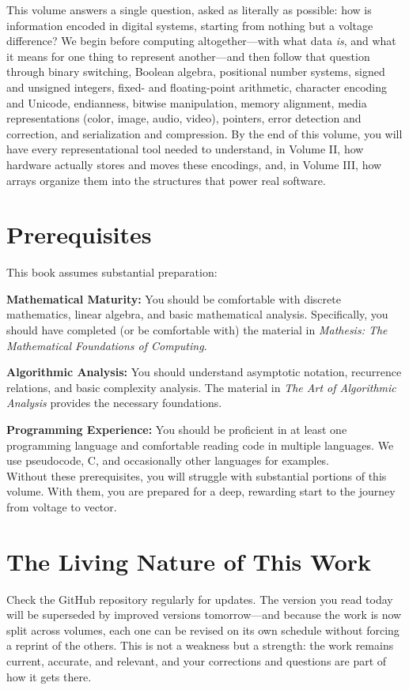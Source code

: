 This volume answers a single question, asked as literally as possible: how is information encoded in digital systems, starting from nothing but a voltage difference? We begin before computing altogether---with what data \emph{is}, and what it means for one thing to represent another---and then follow that question through binary switching, Boolean algebra, positional number systems, signed and unsigned integers, fixed- and floating-point arithmetic, character encoding and Unicode, endianness, bitwise manipulation, memory alignment, media representations (color, image, audio, video), pointers, error detection and correction, and serialization and compression. By the end of this volume, you will have every representational tool needed to understand, in Volume II, how hardware actually stores and moves these encodings, and, in Volume III, how arrays organize them into the structures that power real software.

\section*{Prerequisites}

This book assumes substantial preparation:

\textbf{Mathematical Maturity:} You should be comfortable with discrete mathematics, linear algebra, and basic mathematical analysis. Specifically, you should have completed (or be comfortable with) the material in \textit{Mathesis: The Mathematical Foundations of Computing}.

\textbf{Algorithmic Analysis:} You should understand asymptotic notation, recurrence relations, and basic complexity analysis. The material in \textit{The Art of Algorithmic Analysis} provides the necessary foundations.

\textbf{Programming Experience:} You should be proficient in at least one programming language and comfortable reading code in multiple languages. We use pseudocode, C, and occasionally other languages for examples.\\
Without these prerequisites, you will struggle with substantial portions of this volume. With them, you are prepared for a deep, rewarding start to the journey from voltage to vector.

\section*{The Living Nature of This Work}

Check the GitHub repository regularly for updates. The version you read today will be superseded by improved versions tomorrow---and because the work is now split across volumes, each one can be revised on its own schedule without forcing a reprint of the others. This is not a weakness but a strength: the work remains current, accurate, and relevant, and your corrections and questions are part of how it gets there.


